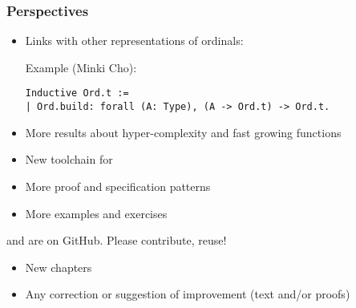 \documentclass[10pt, fleqn]{beamer}
\begin{document}

\begin{frame}[fragile]
  \frametitle{Perspectives}
  \begin{block}{}
    \begin{itemize}

    \item  Links with other representations of ordinals:
      
      \noindent
         Example (Minki Cho):
  \begin{scriptsize}
    {\color{blue}
\begin{verbatim}
Inductive Ord.t :=
| Ord.build: forall (A: Type), (A -> Ord.t) -> Ord.t.
\end{verbatim}
      }
 \end{scriptsize}
      
      \item More results about hyper-complexity and fast growing functions
    \item New toolchain for \alectr
    \item More proof and specification patterns
    \item More examples and exercises
     \end{itemize}
  \end{block}

  \begin{block}{}
  {\color{plugincolor}\Hydras} and  {\color{plugincolor}\community} are on GitHub. {\color{cyan}Please contribute, reuse!}
      \begin{itemize}
      \item New chapters
      \item Any correction or suggestion of improvement (text and/or proofs)
        
  
    \end{itemize}
     \end{block}
 
  
\end{frame}
\end{document}

